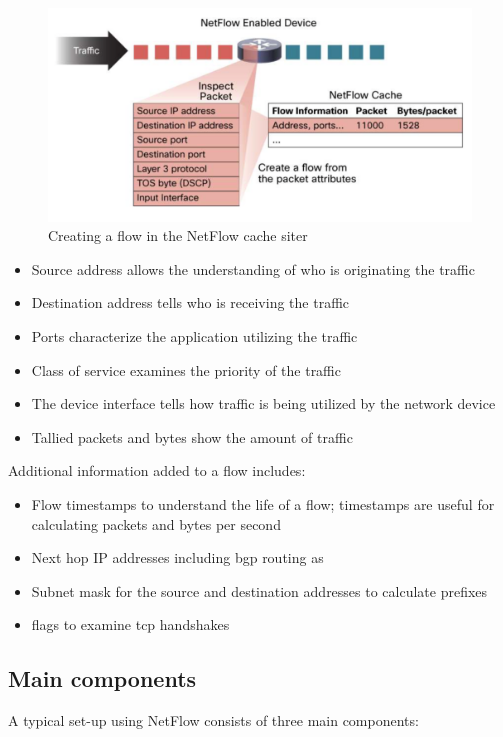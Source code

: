 \begin{figure}[h!]
\includegraphics[scale=0.2]{netflow_cache}
\caption{Creating a flow in the NetFlow cache siter}
\end{figure}

\begin{itemize}
\item Source address allows the understanding of who is originating the traffic
\item Destination address tells who is receiving the traffic
\item Ports characterize the application utilizing the traffic
\item Class of service examines the priority of the traffic
\item The device interface tells how traffic is being utilized by the network device
\item Tallied packets and bytes show the amount of traffic
\end{itemize}

Additional information added to a flow includes:
\begin{itemize}


\item Flow timestamps to understand the life of a flow; timestamps are useful for calculating packets and bytes per second
\item Next hop IP addresses including \gls{bgp} routing \gls{as}
\item Subnet mask for the source and destination addresses to calculate prefixes
 \item  flags to examine \gls{tcp} handshakes

\end{itemize}


\subsection{Main components}
A typical set-up using NetFlow consists of three main components:

